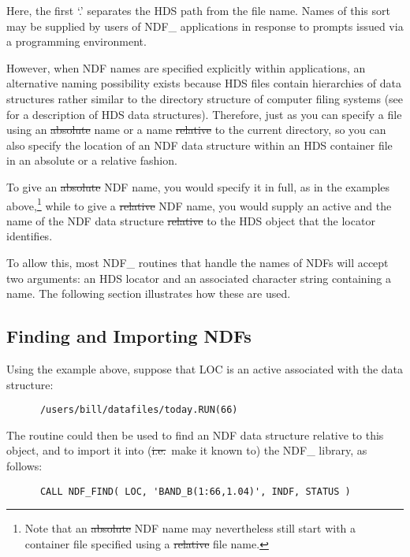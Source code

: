 Here, the first `.' separates the HDS path from the file name. Names
of this sort may be supplied by users of NDF\_ applications in
response to prompts issued via a programming environment.

However, when NDF names are specified explicitly within applications,
an alternative naming possibility exists because HDS files contain
hierarchies of data structures rather similar to the directory
structure of computer filing systems (see
 for a description of HDS data
structures).  Therefore, just as you can specify a file using an
\st{absolute\/} name or a name \st{relative\/} to the current
directory, 
so you can also specify the location of an NDF data structure within
an HDS container file in an absolute or a relative fashion.

To give an \st{absolute\/} NDF name, you would specify it in full, as
in the examples above,\footnote{Note that an \st{absolute\/} NDF name
may nevertheless still start with a container file specified using a
\st{relative\/} file name.} while to give a \st{relative\/} NDF
name, you would supply an active  and the name of the NDF data structure
\st{relative\/} to the HDS object that the locator identifies.

To allow this, most NDF\_ routines that handle the names of NDFs will
accept two arguments: an HDS locator and an associated character
string containing a name. The following section illustrates how these
are used.

\subsection{\label{ss:findingandimporting}Finding and Importing NDFs}

Using the example above, suppose that LOC is an active  associated with the data structure:

\small
\begin{verbatim}
      /users/bill/datafiles/today.RUN(66)
\end{verbatim}
\normalsize

The routine  could then be used to find an NDF data structure
relative to this object, and to import it into (\st{i.e.}\ make it
known to) the NDF\_ library, as follows:

\small
\begin{verbatim}
      CALL NDF_FIND( LOC, 'BAND_B(1:66,1.04)', INDF, STATUS )
\end{verbatim}
\normalsize


